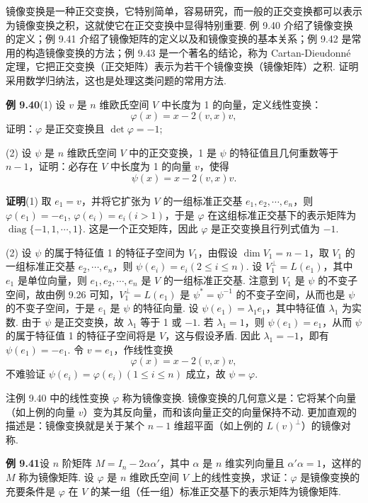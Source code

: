 \documentclass[UTF8,12pt,a4paper,fontset=fandol]{ctexart}
\begin{document}
镜像变换是一种正交变换，它特别简单，容易研究，而一般的正交变换都可以表示为镜像变换之积，这就使它在正交变换中显得特别重要. 例 9.40 介绍了镜像变换的定义；例 9.41 介绍了镜像矩阵的定义以及和镜像变换的基本关系；例 9.42 是常用的构造镜像变换的方法；例 9.43 是一个著名的结论，称为 Cartan-Dieudonné 定理，它把正交变换（正交矩阵）表示为若干个镜像变换（镜像矩阵）之积. 证明采用数学归纳法，这也是处理这类问题的常用方法.

\noindent\textbf{例 9.40}\quad (1) 设 $v$ 是 $n$ 维欧氏空间 $V$ 中长度为 1 的向量，定义线性变换：
\[
\varphi(x)=x-2(v,x)v,
\]
证明：$\varphi$ 是正交变换且 $\det\varphi=-1$;

(2) 设 $\psi$ 是 $n$ 维欧氏空间 $V$ 中的正交变换，1 是 $\psi$ 的特征值且几何重数等于 $n-1$，证明：必存在 $V$ 中长度为 1 的向量 $v$，使得
\[
\psi(x)=x-2(v,x)v.
\]

\noindent\textbf{证明}\quad (1) 取 $e_1=v$，并将它扩张为 $V$ 的一组标准正交基 $e_1,e_2,\cdots,e_n$，则 $\varphi(e_1)=-e_1$, $\varphi(e_i)=e_i(i>1)$，于是 $\varphi$ 在这组标准正交基下的表示矩阵为 $\operatorname{diag}\{-1,1,\cdots,1\}$. 这是一个正交矩阵，因此 $\varphi$ 是正交变换且行列式值为 $-1$.

(2) 设 $\psi$ 的属于特征值 1 的特征子空间为 $V_1$，由假设 $\dim V_1=n-1$，取 $V_1$ 的一组标准正交基 $e_2,\cdots,e_n$，则 $\psi(e_i)=e_i(2\le i\le n)$. 设 $V_1^\perp=L(e_1)$，其中 $e_1$ 是单位向量，则 $e_1,e_2,\cdots,e_n$ 是 $V$ 的一组标准正交基. 注意到 $V_1$ 是 $\psi$ 的不变子空间，故由例 9.26 可知，$V_1^\perp=L(e_1)$ 是 $\psi^*=\psi^{-1}$ 的不变子空间，从而也是 $\psi$ 的不变子空间，于是 $e_1$ 是 $\psi$ 的特征向量. 设 $\psi(e_1)=\lambda_1e_1$，其中特征值 $\lambda_1$ 为实数. 由于 $\psi$ 是正交变换，故 $\lambda_1$ 等于 1 或 $-1$. 若 $\lambda_1=1$，则 $\psi(e_1)=e_1$，从而 $\psi$ 的属于特征值 1 的特征子空间将是 $V$，这与假设矛盾. 因此 $\lambda_1=-1$，即有 $\psi(e_1)=-e_1$. 令 $v=e_1$，作线性变换
\[
\varphi(x)=x-2(v,x)v,
\]
不难验证 $\psi(e_i)=\varphi(e_i)(1\le i\le n)$ 成立，故 $\psi=\varphi$.

注\quad 例 9.40 中的线性变换 $\varphi$ 称为镜像变换. 镜像变换的几何意义是：它将某个向量（如上例的向量 $v$）变为其反向量，而和该向量正交的向量保持不动. 更加直观的描述是：镜像变换就是关于某个 $n-1$ 维超平面（如上例的 $L(v)^\perp$）的镜像对称.

\noindent\textbf{例 9.41}\quad 设 $n$ 阶矩阵 $M=I_n-2\alpha\alpha'$，其中 $\alpha$ 是 $n$ 维实列向量且 $\alpha'\alpha=1$，这样的 $M$ 称为镜像矩阵. 设 $\varphi$ 是 $n$ 维欧氏空间 $V$ 上的线性变换，求证：$\varphi$ 是镜像变换的充要条件是 $\varphi$ 在 $V$ 的某一组（任一组）标准正交基下的表示矩阵为镜像矩阵.
\end{document}
